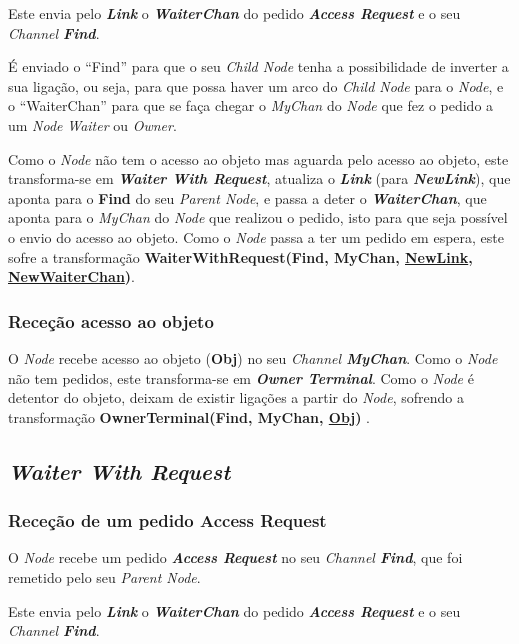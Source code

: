 Este envia pelo \textbf{\emph{Link}} o \textbf{\emph{WaiterChan}} do pedido \emph{\textbf{Access Request}} e o seu \emph{Channel \textbf{Find}}.

É enviado o ``Find'' para que o seu \emph{Child Node} tenha a possibilidade de inverter a sua ligação, ou seja, para que possa haver um arco do \emph{Child Node} para o \emph{Node}, 
e o ``WaiterChan'' para que se faça chegar o \emph{MyChan} do \emph{Node} que fez o pedido a um \emph{Node} \emph{Waiter} ou \emph{Owner}.


Como o \emph{Node} não tem o acesso ao objeto mas aguarda pelo acesso ao objeto, este transforma-se em \emph{\textbf{Waiter With Request}}, atualiza o \textbf{\emph{Link}} (para \textbf{\emph{NewLink}}),
que aponta para o \textbf{Find} do seu \emph{Parent Node}, 
e passa a deter o \textbf{\emph{WaiterChan}}, que aponta para o \emph{MyChan} do \emph{Node} que realizou o pedido, isto para que seja possível o envio do acesso ao objeto.
Como o \emph{Node} passa a ter um pedido em espera, este sofre a transformação \textbf{WaiterWithRequest(Find, MyChan, \underline{NewLink}, \underline{NewWaiterChan})}.


\subsubsection*{Receção acesso ao objeto}
O \emph{Node} recebe acesso ao objeto (\textbf{Obj}) no seu \emph{Channel \textbf{MyChan}}.
Como o \emph{Node} não tem pedidos, este transforma-se em \textbf{\emph{Owner Terminal}}.
Como o \emph{Node} é detentor do objeto, deixam de existir ligações a partir do \emph{Node}, sofrendo a transformação \textbf{ OwnerTerminal(Find, MyChan, \underline{Obj}) }.




\subsection*{\emph{Waiter With Request}}
\label{especificacao:nodes:waiter_with_request}


\subsubsection*{Receção de um pedido Access Request}
O \emph{Node} recebe um pedido \emph{\textbf{Access Request}} no seu \emph{Channel \textbf{Find}}, que foi remetido pelo seu \emph{Parent Node}.

Este envia pelo \textbf{\emph{Link}} o \textbf{\emph{WaiterChan}} do pedido \emph{\textbf{Access Request}} e o seu \emph{Channel \textbf{Find}}.

